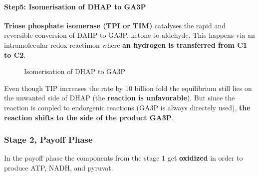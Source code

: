 \documentclass[../main.tex]{subfiles}
\begin{document}
\paragraph{Step5: Isomerisation of DHAP to GA3P}
\textbf{Triose phosphate isomerase (TPI or TIM)} catalyses the rapid and reversible conversion of DAHP to GA3P, ketone to aldehyde. This happens via an intramolecular redox reactimon where \textbf{an hydrogen is transferred from C1 to C2}.
\begin{figure}[H]
	\centering
	\caption{Isomerisation of DHAP to GA3P}
\end{figure}
Even though TIP increases the rate by 10 billion fold the equilibrium still lies on the unwanted side of DHAP (the \textbf{reaction is unfavorable}). But since the reaction is coupled to endorgenic reactions (GA3P is always directely used), \textbf{the reaction shifts to the side of the product GA3P}.  

\subsubsection{Stage 2, Payoff Phase}
In the payoff phase the components from the stage 1 get \textbf{oxidized} in order to produce ATP, NADH, and pyruvat. 
\end{document}

